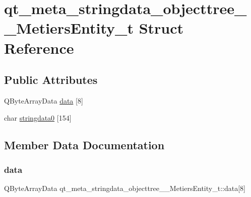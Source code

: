 \hypertarget{structqt__meta__stringdata__objecttree_____metiers_entity__t}{}\section{qt\+\_\+meta\+\_\+stringdata\+\_\+objecttree\+\_\+\+\_\+\+Metiers\+Entity\+\_\+t Struct Reference}
\label{structqt__meta__stringdata__objecttree_____metiers_entity__t}
\subsection*{Public Attributes}
\begin{DoxyCompactItemize}
\item 
Q\+Byte\+Array\+Data \mbox{\hyperlink{structqt__meta__stringdata__objecttree_____metiers_entity__t_ac79c0de9643915182fd2c25bca2d5e17}{data}} \mbox{[}8\mbox{]}
\item 
char \mbox{\hyperlink{structqt__meta__stringdata__objecttree_____metiers_entity__t_a8f1c86ace93345dcbe285808b03955ea}{stringdata0}} \mbox{[}154\mbox{]}
\end{DoxyCompactItemize}


\subsection{Member Data Documentation}
\mbox{\label{structqt__meta__stringdata__objecttree_____metiers_entity__t_ac79c0de9643915182fd2c25bca2d5e17}} 
\subsubsection{\texorpdfstring{data}{data}}
{\footnotesize\ttfamily Q\+Byte\+Array\+Data qt\+\_\+meta\+\_\+stringdata\+\_\+objecttree\+\_\+\+\_\+\+Metiers\+Entity\+\_\+t\+::data\mbox{[}8\mbox{]}}

\mbox{\label{structqt__meta__stringdata__objecttree_____metiers_entity__t_a8f1c86ace93345dcbe285808b03955ea}} 
